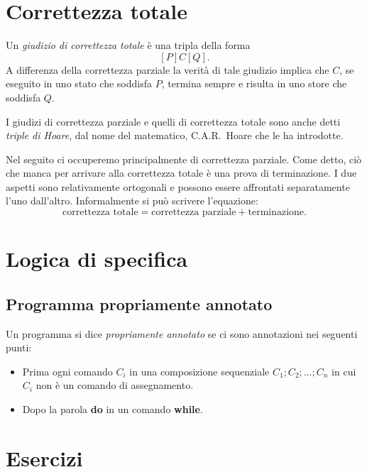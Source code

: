 \section{Correttezza totale} 
\begin{definizione}
Un \emph{giudizio di correttezza totale} è una tripla della forma
\[
  [P] C [Q].
\]
A differenza della correttezza parziale la verità di tale giudizio
implica che $C$, se eseguito in uno stato che soddisfa $P$,
termina sempre e risulta in uno store che soddisfa $Q$.
\end{definizione}

I giudizi di correttezza parziale e quelli di correttezza totale
sono anche detti \emph{triple di Hoare}, dal nome del matematico,
C.A.R.\ Hoare che le ha introdotte.

Nel seguito ci occuperemo principalmente di correttezza parziale.
Come detto, ciò che manca per arrivare alla correttezza totale
è una prova di terminazione.  I due aspetti sono relativamente
ortogonali e possono essere affrontati separatamente l'uno
dall'altro.  Informalmente si può scrivere l'equazione:
\[
  \textrm{correttezza totale}
    = \textrm{correttezza parziale} + \textrm{terminazione}.
\]

\section{Logica di specifica}


\subsection{Programma propriamente annotato}
\begin{definizione}
Un programma si dice \emph{propriamente annotato} se ci sono annotazioni nei seguenti punti:
\begin{itemize}
        \item Prima ogni comando $C_i$ in una composizione sequenziale $C_1;C_2; \dots ;C_n$ in cui $C_i$ non è un comando di assegnamento.
        \item Dopo la parola \textbf{do} in un comando \textbf{while}.
\end{itemize}
\end{definizione}


\section{Esercizi}

